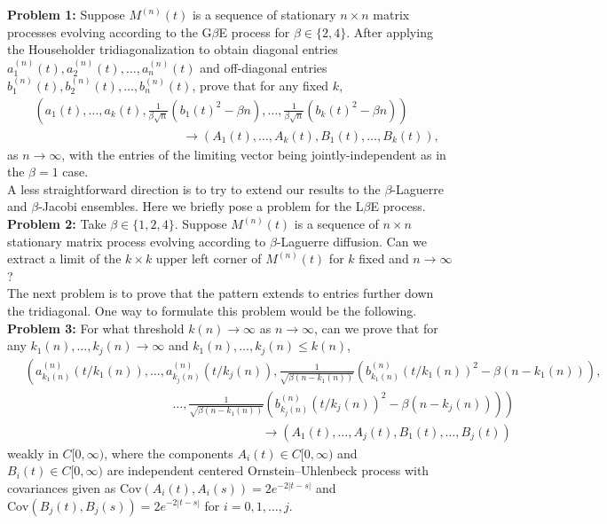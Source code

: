 \documentclass{amsart}
\numberwithin{equation}{section}
\begin{document}
\noindent\textbf{Problem 1:} Suppose $M^{(n)}(t)$ is a sequence of stationary $n \times n$ matrix processes evolving according to the G$\beta$E process   for $\beta \in \{2,4\}$. After applying the Householder tridiagonalization to obtain diagonal entries $a_1^{(n)}(t), a_2^{(n)}(t),\dots,a_n^{(n)}(t)$ and off-diagonal entries $b_1^{(n)}(t), b_2^{(n)}(t),\dots,b_n^{(n)}(t)$, prove that for any fixed $k$,
\begin{equation*}
    \begin{split}
        ~&\left(a_1(t),\dots,a_k(t), \frac{1}{\beta \sqrt{n}}(b_1(t)^2-\beta n),\dots,\frac{1}{\beta\sqrt{n}}(b_k(t)^2-\beta n)\right) \\
        &\hspace{5cm}\to \left(A_1(t),\dots,A_k(t),B_1(t),\dots,B_k(t)\right),
    \end{split}
\end{equation*}
as $n\to\infty$, with the entries of the limiting vector being jointly-independent as in the $\beta=1$ case.\\

A less straightforward direction is to try to extend our results to the $\beta$-Laguerre and $\beta$-Jacobi ensembles. Here we briefly pose a problem for the L$\beta$E process. \\

\noindent\textbf{Problem 2:} Take $\beta \in \{1,2,4\}$. Suppose $M^{(n)}(t)$ is a sequence of $n \times n$ stationary matrix process evolving according to $\beta$-Laguerre diffusion. Can we extract a limit of the $k \times k$ upper left corner of $M^{(n)}(t)$ for $k$ fixed and $n \to \infty$?   \\

The next problem is to prove that the pattern extends to entries further down the tridiagonal. One way to formulate this problem would be the following.\\

\noindent \textbf{Problem 3:}
For what threshold $k(n) \to \infty$ as $n \to \infty$, can we prove that for any $k_1(n),\dots,k_j(n) \to \infty$ and $k_1(n),\dots,k_j(n) \leq k(n)$,
\begin{equation*}
    \begin{split}
        ~&\left(a_{k_1(n)}^{(n)}(t/k_1(n)),\dots,a_{k_j(n)}^{(n)}(t/k_j(n)), \frac{1}{\sqrt{\beta(n-k_1(n))}} \left(b_{k_1(n)}^{(n)}(t/k_1(n))^2-\beta (n-k_1(n))\right),\right. \\
        &\hspace{5cm}\dots, \left.\frac{1}{\sqrt{\beta(n-k_1(n))}}\left(b_{k_j(n)}^{(n)}(t/k_j(n))^2-\beta (n-k_j(n))\right)\right)\\
        &\hspace{8cm}\to (A_1(t),\dots,A_j(t),B_1(t),\dots,B_j(t))
    \end{split}
\end{equation*}
weakly in $C[0,\infty)$, where the components $A_i(t) \in C[0,\infty)$ and $B_i(t) \in C[0,\infty)$ are independent centered Ornstein--Uhlenbeck process with covariances given as $\mathrm{Cov}(A_i(t),A_i(s))=2e^{-2|t-s|}$ and $\mathrm{Cov}(B_j(t),B_j(s))=2e^{-2|t-s|}$ for $i=0,1,\dots,j$. \\
\end{document}
